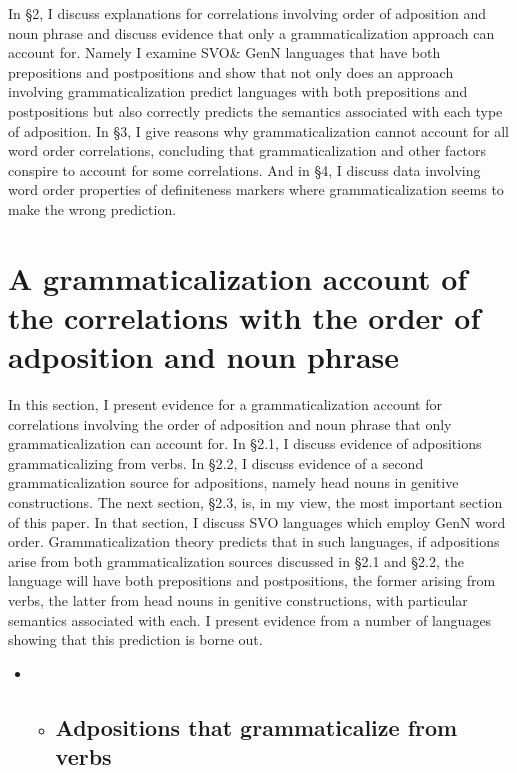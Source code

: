 \documentclass[output=paper]{langsci/langscibook}
\begin{document}
In §2, I discuss explanations for correlations involving order of adposition and noun phrase and discuss evidence that only a grammaticalization approach can account for. Namely I examine SVO\& GenN languages that have both prepositions and postpositions and show that not only does an approach involving grammaticalization predict languages with both prepositions and postpositions but also correctly predicts the semantics associated with each type of adposition. In §3, I give reasons why grammaticalization cannot account for all word order correlations, concluding that grammaticalization and other factors conspire to account for some correlations. And in §4, I discuss data involving word order properties of definiteness markers where grammaticalization seems to make the wrong prediction.

\section{A grammaticalization account of the correlations with the order of adposition and noun phrase} 

In this section, I present evidence for a grammaticalization account for correlations involving the order of adposition and noun phrase that only grammaticalization can account for. In §2.1, I discuss evidence of adpositions grammaticalizing from verbs. In §2.2, I discuss evidence of a second grammaticalization source for adpositions, namely head nouns in genitive constructions. The next section, §2.3, is, in my view, the most important section of this paper. In that section, I discuss SVO languages which employ GenN word order. Grammaticalization theory predicts that in such languages, if adpositions arise from both grammaticalization sources discussed in §2.1 and §2.2, the language will have both prepositions and postpositions, the former arising from verbs, the latter from head nouns in genitive constructions, with particular semantics associated with each. I present evidence from a number of languages showing that this prediction is borne out.

\begin{itemize}
\item \begin{itemize}
\item \subsection{Adpositions that grammaticalize from verbs}\end{itemize}
\end{itemize}
\end{document}
